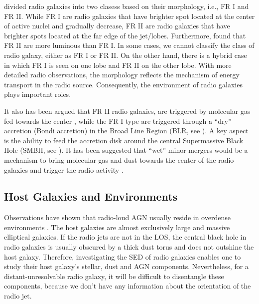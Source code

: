 \cite{fanaroff1974} divided radio galaxies into two clasess based on their morphology, i.e., FR I and FR II. While FR I are radio galaxies that have brighter spot located at the center of active nuclei and gradually decrease, FR II are radio galaxies that have brighter spots located at the far edge of the jet/lobes. Furthermore, \cite{fanaroff1974} found that FR II are more luminous than FR I. In some cases, we cannot classify the class of radio galaxy, either as FR I or FR II. On the other hand, there is a hybrid case in which FR I is seen on one lobe and FR II on the other lobe. With more detailed radio observations, the morphology reflects the mechanism of energy transport in the radio source. Consequently, the environment of radio galaxies plays important roles.

It also has been argued that FR II radio galaxies, are triggered by molecular gas fed towards the center \citep{buttiglione2010}, while the FR I type are triggered through a ``dry'' accretion (Bondi accretion) in the Broad Line Region (BLR, see \citep{fromerth2001}). A key aspect is the ability to feed the accretion disk around the central Supermassive Black Hole (SMBH, see \cite{merloni2008}). It has been suggested that ``wet'' minor mergers would be a mechanism to bring molecular gas and dust towards the center of the radio galaxies and trigger the radio activity \citep[e.g.,][]{lim2000, israel1998}.

\subsection{Host Galaxies and Environments}

Observations have shown that radio-loud AGN usually reside in overdense environments \citep[see, e.g.,][]{stevens2003, venemans2007, falder2010, galametz2010b, galametz2012, mayo2012}. The host galaxies are almost exclusively large and massive elliptical galaxies. If the radio jets are not in the LOS, the central black hole in radio galaxies is usually obscured by a thick dust torus and does not outshine the host galaxy. Therefore, investigating the SED of radio galaxies enables one to study their host galaxy's stellar, dust and AGN components. Nevertheless, for a distant-unresolvable radio galaxy, it will be difficult to disentangle these components, because we don't have any information about the orientation of the radio jet.

